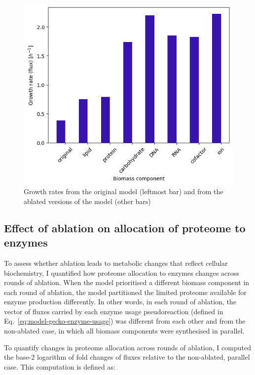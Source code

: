 \begin{figure}[hb!]
  \centering
  \includegraphics[width=.6\linewidth]{ablation_example_fluxes.png}
  \caption[
    Growth rates from the original model and from the ablated versions of the model
  ]{
    Growth rates from the original model (leftmost bar) and from the ablated versions of the model (other bars)
  }
  \label{fig:model-ablate-fluxes}
\end{figure}


\subsection{Effect of ablation on allocation of proteome to enzymes}
\label{sec:model-yeast8-pseudometabolites-allocation}

To assess whether ablation leads to metabolic changes that reflect cellular biochemistry, I quantified how proteome allocation to enzymes changes across rounds of ablation.
When the model prioritised a different biomass component in each round of ablation, the model partitioned the limited proteome available for enzyme production differently.
In other words, in each round of ablation, the vector of fluxes carried by each enzyme usage pseudoreaction (defined in Eq.\ \ref{eq:model-gecko-enzyme-usage}) was different from each other and from the non-ablated case, in which all biomass components were synthesised in parallel.

To quantify changes in proteome allocation across rounds of ablation, I computed the base-2 logarithm of fold changes of fluxes relative to the non-ablated, parallel case.
This computation is defined as:

